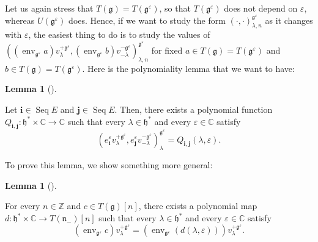 \documentclass
[numbers=enddot,12pt,final,onecolumn,german,notitlepage]{scrartcl}%
\theoremstyle{definition}
\newtheorem{lem}[theo]{Lemma}
\newenvironment{lemma}[1][]
{\begin{lem}[#1]\begin{leftbar}}
{\end{leftbar}\end{lem}}
\begin{document}
Let us again stress that $T\left(  \mathfrak{g}\right)  =T\left(
\mathfrak{g}^{\varepsilon}\right)  $, so that $T\left(  \mathfrak{g}%
^{\varepsilon}\right)  $ does not depend on $\varepsilon$, whereas $U\left(
\mathfrak{g}^{\varepsilon}\right)  $ does. Hence, if we want to study the form
$\left(  \cdot,\cdot\right)  _{\lambda,n}^{\mathfrak{g}^{\varepsilon}}$ as it
changes with $\varepsilon$, the easiest thing to do is to study the values of
$\left(  \left(  \operatorname*{env}\nolimits_{\mathfrak{g}^{\varepsilon}%
}a\right)  v_{\lambda}^{+\mathfrak{g}^{\varepsilon}},\left(
\operatorname*{env}\nolimits_{\mathfrak{g}^{\varepsilon}}b\right)
v_{-\lambda}^{-\mathfrak{g}^{\varepsilon}}\right)  _{\lambda,n}^{\mathfrak{g}%
^{\varepsilon}}$ for fixed $a\in T\left(  \mathfrak{g}\right)  =T\left(
\mathfrak{g}^{\varepsilon}\right)  $ and $b\in T\left(  \mathfrak{g}\right)
=T\left(  \mathfrak{g}^{\varepsilon}\right)  $. Here is the polynomiality
lemma that we want to have:

\begin{lemma}
\label{lem.invformnondeg.polynomiality}Let $\mathbf{i}\in\operatorname*{Seq}E$
and $\mathbf{j}\in\operatorname*{Seq}E$. Then, there exists a polynomial
function $Q_{\mathbf{i},\mathbf{j}}:\mathfrak{h}^{\ast}\times\mathbb{C}%
\rightarrow\mathbb{C}$ such that every $\lambda\in\mathfrak{h}^{\ast}$ and
every $\varepsilon\in\mathbb{C}$ satisfy%
\[
\left(  e_{\mathbf{i}}^{\varepsilon}v_{\lambda}^{+\mathfrak{g}^{\varepsilon}%
},e_{\mathbf{j}}^{\varepsilon}v_{-\lambda}^{-\mathfrak{g}^{\varepsilon}%
}\right)  _{\lambda}^{\mathfrak{g}^{\varepsilon}}=Q_{\mathbf{i},\mathbf{j}%
}\left(  \lambda,\varepsilon\right)  .
\]

\end{lemma}

To prove this lemma, we show something more general:

\begin{lemma}
\label{lem.invformnondeg.polynomiality2}For every $n\in\mathbb{Z}$ and $c\in
T\left(  \mathfrak{g}\right)  \left[  n\right]  $, there exists a polynomial
map $d:\mathfrak{h}^{\ast}\times\mathbb{C}\rightarrow T\left(  \mathfrak{n}%
_{-}\right)  \left[  n\right]  $ such that every $\lambda\in\mathfrak{h}%
^{\ast}$ and every $\varepsilon\in\mathbb{C}$ satisfy%
\[
\left(  \operatorname*{env}\nolimits_{\mathfrak{g}^{\varepsilon}}c\right)
v_{\lambda}^{+\mathfrak{g}^{\varepsilon}}=\left(  \operatorname*{env}%
\nolimits_{\mathfrak{g}^{\varepsilon}}\left(  d\left(  \lambda,\varepsilon
\right)  \right)  \right)  v_{\lambda}^{+\mathfrak{g}^{\varepsilon}}.
\]

\end{lemma}
\end{document}

